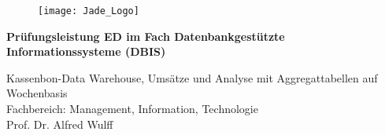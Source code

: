 
\begin{titlepage}

  \begin{centering}
  \begin{figure}[h!]
    \centering
    \texttt{[image: Jade\_Logo]}
  \end{figure}



  \vspace*{0.4cm}

  \textsf{\Huge \textbf{Prüfungsleistung ED
  im Fach
  Datenbankgestützte Informationssysteme (DBIS)
  \\}}

  \vspace*{0.5cm}
  \textsf{\Huge Kassenbon-Data Warehouse, Umsätze und Analyse mit Aggregattabellen auf Wochenbasis
  \\}
  \vspace*{0.2 cm}
  \noindent Fachbereich: Management, Information, Technologie \\
Prof. Dr. Alfred Wulff

  \end{centering}

  \vspace*{1.5cm}

  \begin{center}
  \end{center}

\end{titlepage}
\newpage

